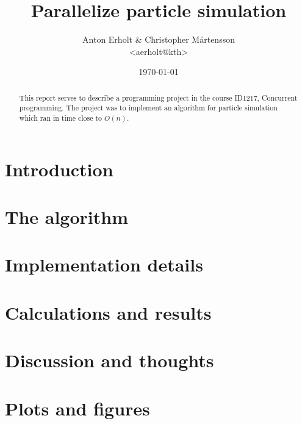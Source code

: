 \documentclass[11pt]{article}
\author{Anton Erholt \& Christopher Mårtensson \\ <aerholt@kth>}
\date{\today}
\title{Parallelize particle simulation}
\begin{document}
\maketitle
\newpage
\begin{abstract}

This report serves to describe a programming project in the course ID1217,
Concurrent programming. The project was to implement an algorithm for particle
simulation which ran in time close to $O(n)$.

\end{abstract}
\newpage


\section*{Introduction}
\label{sec-1}

\section*{The algorithm}
\label{sec-2}

\section*{Implementation details}
\label{sec-3}

\section*{Calculations and results}
\label{sec-4}

\section*{Discussion and thoughts}
\label{sec-5}

\section*{Plots and figures}
\label{sec-6}
\end{document}
